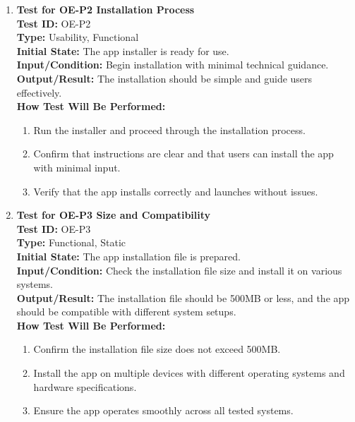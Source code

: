 \documentclass[12pt, titlepage]{article}
\begin{document}
\begin{enumerate}
    \item \textbf{Test for OE-P2 Installation Process} \\
      \newline
      \textbf{Test ID:} OE-P2 \\
      \textbf{Type:} Usability, Functional \\
      \textbf{Initial State:} The app installer is ready for use. \\
      \textbf{Input/Condition:} Begin installation with minimal technical guidance. \\
      \textbf{Output/Result:} The installation should be simple and guide users effectively. \\
      \textbf{How Test Will Be Performed:}
      \begin{enumerate}
          \item Run the installer and proceed through the installation process.
          \item Confirm that instructions are clear and that users can install the app with minimal input.
          \item Verify that the app installs correctly and launches without issues.
      \end{enumerate}

    \item \textbf{Test for OE-P3 Size and Compatibility} \\
      \newline
      \textbf{Test ID:} OE-P3 \\
      \textbf{Type:} Functional, Static \\
      \textbf{Initial State:} The app installation file is prepared. \\
      \textbf{Input/Condition:} Check the installation file size and install it on various systems. \\
      \textbf{Output/Result:} The installation file should be 500MB or less, and the app should be compatible with different 
      system setups. \\
      \textbf{How Test Will Be Performed:}
      \begin{enumerate}
          \item Confirm the installation file size does not exceed 500MB.
          \item Install the app on multiple devices with different operating systems and hardware specifications.
          \item Ensure the app operates smoothly across all tested systems.
      \end{enumerate}


\end{enumerate}
\end{document}
